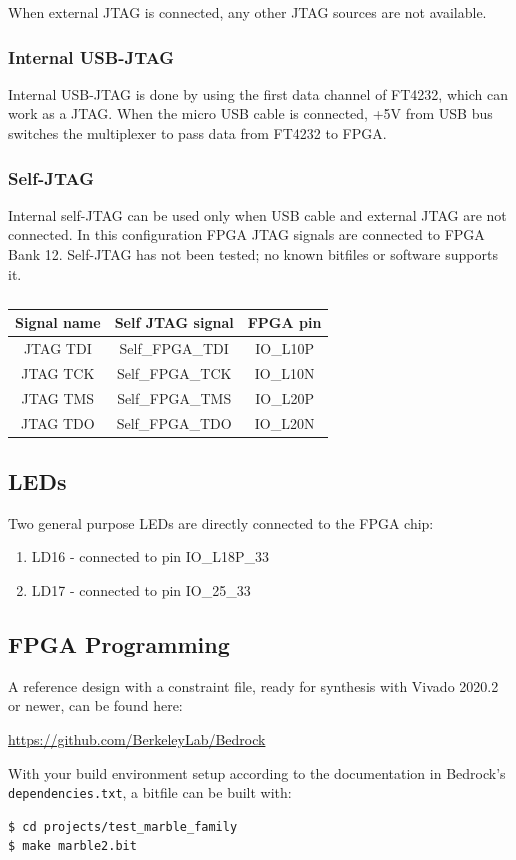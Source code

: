 \documentclass[12pt,oneside,a4]{article}
\begin{document}
When external JTAG is connected, any other JTAG sources are not available.

\subsubsection{Internal USB-JTAG}
Internal USB-JTAG is done by using the first data channel of FT4232, which can work as a JTAG. When the micro USB cable is connected, +5V
from USB bus switches the multiplexer to pass data from FT4232 to FPGA.

\subsubsection{Self-JTAG}
Internal self-JTAG can be used only when USB cable and external JTAG are not connected. In this configuration FPGA JTAG signals are connected to FPGA Bank 12.
Self-JTAG has not been tested; no known bitfiles or software supports it.

\begin{table}[htbp]
\centering
\begin{tabular}{@{}ccc@{}}
\toprule
Signal name& Self JTAG signal & FPGA pin \\ \midrule
JTAG TDI & Self\_FPGA\_TDI & IO\_L10P \\
JTAG TCK & Self\_FPGA\_TCK & IO\_L10N \\
JTAG TMS & Self\_FPGA\_TMS & IO\_L20P \\
JTAG TDO & Self\_FPGA\_TDO & IO\_L20N \\ \bottomrule
\end{tabular}
\caption{}
\label{tab:selfjtag}
\end{table}

\subsection{LEDs}
Two general purpose LEDs are directly connected to the FPGA chip:
\begin{enumerate}
	\item LD16 - connected to pin IO\_L18P\_33
	\item LD17 - connected to pin IO\_25\_33
\end{enumerate}

\subsection{FPGA Programming}
A reference design with a constraint file, ready for synthesis with Vivado 2020.2 or newer,
can be found here:
\begin{leftbar}
\url{https://github.com/BerkeleyLab/Bedrock}
\end{leftbar}
With your build environment setup according to the documentation in Bedrock's\hfil\break
{\tt dependencies.txt}, a bitfile can be built with:
	\begin{lstlisting}[backgroundcolor = \color{Gainsboro}, language=bash, frame=none]
$ cd projects/test_marble_family
$ make marble2.bit
	\end{lstlisting}
\end{document}

